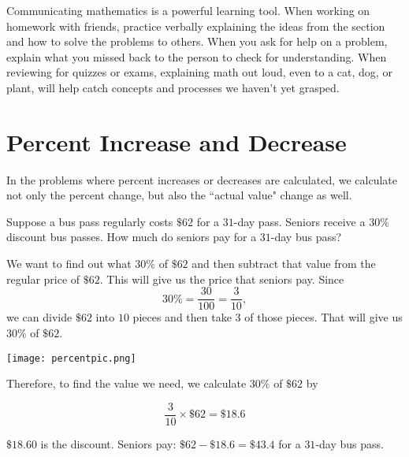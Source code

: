 \documentclass{ximera}
\begin{document}
\begin{MM}
Communicating mathematics is a powerful learning tool.  When working on homework with friends, practice verbally explaining the ideas from the section and how to solve the problems to others.  When you ask for help on a problem, explain what you missed back to the person to check for understanding. When reviewing for quizzes or exams, explaining math out loud, even to a cat, dog, or plant, will help catch concepts and processes we haven't yet grasped.  
\end{MM}

\section{Percent Increase and Decrease}



In the problems where percent increases or decreases are calculated, we calculate not only the percent change, but also the ``actual value" change as well.  

\begin{example}
Suppose a bus pass regularly costs $\$62$ for a $31$-day pass. Seniors receive a $30\%$ discount bus passes. How much do seniors pay for a $31$-day bus pass?

\begin{explanation}
We want to find out what $30\%$ of $\$62$ and then subtract that value from the regular price of $\$62$.  This will give us the price that seniors pay.  Since $$30\%=\frac{30}{100}=\frac{3}{10},$$ we can divide $\$62$ into $10$ pieces and then take $3$ of those pieces.  That will give us $30\%$ of $\$62$.

\begin{image}
    \texttt{[image: percentpic.png]}
\end{image}

%
%
%


Therefore, to find the value we need, we calculate $30\%$ of $\$62$ by

$$ \frac{3}{10} \times \$62 = \$18.6$$ 

$\$18.60$ is the discount.  Seniors pay: $\$62 - \$18.6 = \$43.4$ for a $31$-day bus pass.
\end{explanation}
\end{example}
\end{document}
